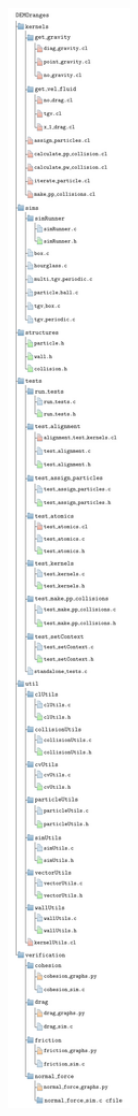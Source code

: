 \documentclass[../Interim_Report_Master]{subfiles}
\begin{document}
\begin{figure}
	\centering
	\includegraphics*[width=0.5\textwidth, trim=0 550 0 580, clip]{./Diagrams/DEMOranges_Structure/DEMOranges_Structure.pdf}
\end{figure}
\end{document}
